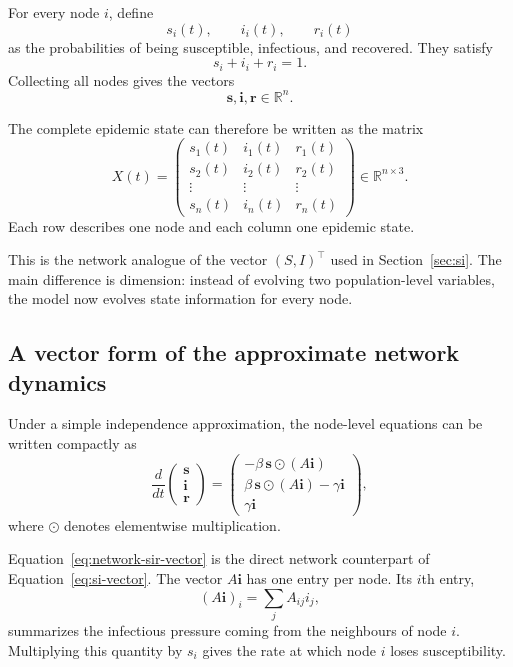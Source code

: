 \documentclass[11pt,a4paper]{article}
\begin{document}
For every node $i$, define
\[
    s_i(t),\qquad i_i(t),\qquad r_i(t)
\]
as the probabilities of being susceptible, infectious, and recovered. They
satisfy
\[
    s_i+i_i+r_i=1.
\]
Collecting all nodes gives the vectors
\[
    \mathbf{s},\mathbf{i},\mathbf{r}\in\mathbb{R}^n.
\]

The complete epidemic state can therefore be written as the matrix
\begin{equation}
    X(t)=
    \begin{pmatrix}
        s_1(t) & i_1(t) & r_1(t)\\
        s_2(t) & i_2(t) & r_2(t)\\
        \vdots & \vdots & \vdots\\
        s_n(t) & i_n(t) & r_n(t)
    \end{pmatrix}
    \in\mathbb{R}^{n\times 3}.
    \label{eq:network-state-matrix}
\end{equation}
Each row describes one node and each column one epidemic state.

This is the network analogue of the vector
$(S,I)^\top$ used in Section~\ref{sec:si}. The main difference is dimension:
instead of evolving two population-level variables, the model now evolves
state information for every node.


\subsection{A vector form of the approximate network dynamics}

Under a simple independence approximation, the node-level equations can be
written compactly as
\begin{equation}
    \frac{d}{dt}
    \begin{pmatrix}
        \mathbf{s}\\
        \mathbf{i}\\
        \mathbf{r}
    \end{pmatrix}
    =
    \begin{pmatrix}
        -\beta\,\mathbf{s}\odot(A\mathbf{i})\\[3pt]
         \beta\,\mathbf{s}\odot(A\mathbf{i})-\gamma\mathbf{i}\\[3pt]
         \gamma\mathbf{i}
    \end{pmatrix},
    \label{eq:network-sir-vector}
\end{equation}
where $\odot$ denotes elementwise multiplication.

Equation~\eqref{eq:network-sir-vector} is the direct network counterpart of
Equation~\eqref{eq:si-vector}. The vector $A\mathbf{i}$ has one entry per node.
Its $i$th entry,
\[
    (A\mathbf{i})_i=\sum_j A_{ij}i_j,
\]
summarizes the infectious pressure coming from the neighbours of node $i$.
Multiplying this quantity by $s_i$ gives the rate at which node $i$ loses
susceptibility.
\end{document}
